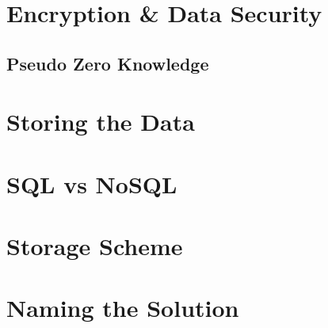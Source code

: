 	\section{Encryption \& Data Security}
		\subsection{Pseudo Zero Knowledge}


	\section{Storing the Data}
		\section{SQL vs NoSQL}
	\section{Storage Scheme}

	\section{Naming the Solution}

